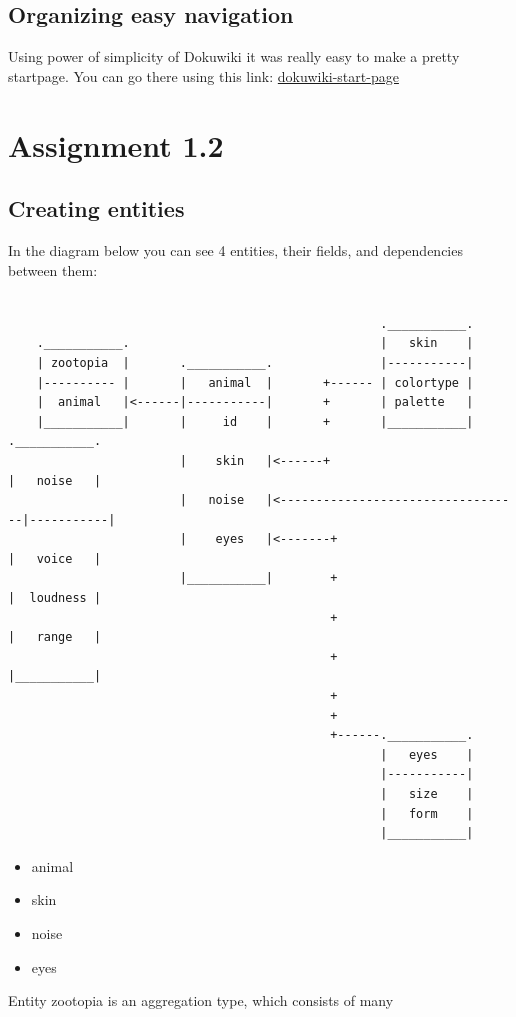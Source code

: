 \documentclass{article}
\begin{document}
\subsection{Organizing easy navigation}
Using power of simplicity of Dokuwiki it was really easy to make a pretty startpage. You can go there using this link: \href{http://188.130.155.38:11180/doku.php}{dokuwiki-start-page}
\newpage
\section{Assignment 1.2}
\subsection{Creating entities}
\label{subsec:dia}
In the diagram below you can see 4 entities, their fields, and dependencies between them:

\begin{verbatim}
   
                                                    .___________.
    .___________.                                   |   skin    |
    | zootopia  |       .___________.               |-----------|
    |---------- |       |   animal  |       +------ | colortype |
    |  animal   |<------|-----------|       +       | palette   |
    |___________|       |     id    |       +       |___________|       .___________.
                        |    skin   |<------+                           |   noise   |
                        |   noise   |<----------------------------------|-----------|
                        |    eyes   |<-------+                          |   voice   |
                        |___________|        +                          |  loudness |
                                             +                          |   range   |
                                             +                          |___________|
                                             +
                                             +    
                                             +------.___________.
                                                    |   eyes    |
                                                    |-----------|
                                                    |   size    |
                                                    |   form    |
                                                    |___________|

\end{verbatim} 

\begin{itemize}
    \item animal
    \item skin
    \item noise
    \item eyes
\end{itemize}
Entity zootopia is an aggregation type, which consists of many 
\end{document}
